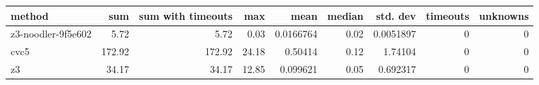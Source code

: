 \begin{tabular}{lrrrrrrrr}
\hline
 method             &    sum &   sum with timeouts &   max &      mean &   median &   std. dev &   timeouts &   unknowns \\
\hline
 z3-noodler-9f5e602 &   5.72 &                5.72 &  0.03 & 0.0166764 &     0.02 &  0.0051897 &          0 &          0 \\
 cvc5               & 172.92 &              172.92 & 24.18 & 0.50414   &     0.12 &  1.74104   &          0 &          0 \\
 z3                 &  34.17 &               34.17 & 12.85 & 0.099621  &     0.05 &  0.692317  &          0 &          0 \\
\hline
\end{tabular}
